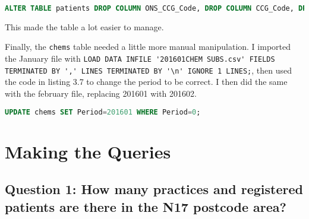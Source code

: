 \documentclass{report}
\begin{document}
\begin{lstlisting}[language=SQL, caption=Trimming down the patients table]
ALTER TABLE patients DROP COLUMN ONS_CCG_Code, DROP COLUMN CCG_Code, DROP COLUMN ONS_Region_Code, DROP COLUMN NHSE_Region_Code, DROP COLUMN ONS_Comm_Rgn_Code, DROP COLUMN NHSE_Comm_Rgn_Code, DROP COLUMN Total_Male, DROP COLUMN Total_Female, DROP COLUMN Male_0_4, DROP COLUMN Male_5_9, DROP COLUMN Male_10_14, DROP COLUMN Male_15_19, DROP COLUMN Male_20_24, DROP COLUMN Male_25_29, DROP COLUMN Male_30_34, DROP COLUMN Male_35_39, DROP COLUMN Male_40_44, DROP COLUMN Male_45_49, DROP COLUMN Male_50_54, DROP COLUMN Male_55_59, DROP COLUMN Male_60_64, DROP COLUMN Male_65_69, DROP COLUMN Male_70_74, DROP COLUMN Male_75_79, DROP COLUMN Male_80_84, DROP COLUMN Male_85_89, DROP COLUMN Male_90_94, DROP COLUMN Male_95_Up, DROP COLUMN Female_0_4, DROP COLUMN Female_5_9, DROP COLUMN Female_10_14, DROP COLUMN Female_15_19, DROP COLUMN Female_20_24, DROP COLUMN Female_25_29, DROP COLUMN Female_30_34, DROP COLUMN Female_35_39, DROP COLUMN Female_40_44, DROP COLUMN Female_45_49, DROP COLUMN Female_50_54, DROP COLUMN Female_55_59, DROP COLUMN Female_60_64, DROP COLUMN Female_65_69, DROP COLUMN Female_70_74, DROP COLUMN Female_75_79, DROP COLUMN Female_80_84, DROP COLUMN Female_85_89, DROP COLUMN Female_90_94, DROP COLUMN Female_95_Up;
\end{lstlisting}
This made the table a lot easier to manage.

Finally, the \texttt{chems} table needed a little more manual manipulation. I imported the January file with \lstinline{LOAD DATA INFILE '201601CHEM SUBS.csv' FIELDS TERMINATED BY ',' LINES TERMINATED BY '\n' IGNORE 1 LINES;}, then used the code in listing 3.7 to change the period to be correct. I then did the same with the february file, replacing 201601 with 201602.

\begin{lstlisting}[language=SQL, caption=Fixing period field in chems table]
UPDATE chems SET Period=201601 WHERE Period=0;
\end{lstlisting}

\chapter{Making the Queries}
\section{Question 1: How many practices and registered patients are there in the N17 postcode area?}
\end{document}
